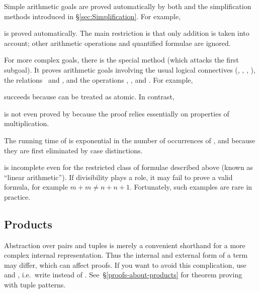 Simple arithmetic goals are proved automatically by both 
and the simplification methods introduced in \S\ref{sec:Simplification}.  For
example,

%
is proved automatically. The main restriction is that only addition is taken
into account; other arithmetic operations and quantified formulae are ignored.

For more complex goals, there is the special method
 (which attacks the first subgoal). It proves
arithmetic goals involving the usual logical connectives (\isasymnot,
\isasymand, \isasymor, \isasymimp), the relations \isasymle\ and \isa{<}, and
the operations \isa{+}, \isa{-},  and . For example,

%
succeeds because  can be treated as atomic.
In contrast,

%
is not even proved by  because the proof relies essentially
on properties of multiplication.

\begin{warn}
  The running time of  is exponential in the number of occurrences
  of ,  and
   because they are first eliminated by case distinctions.

   is incomplete even for the restricted class of formulae
  described above (known as ``linear arithmetic''). If divisibility plays a
  role, it may fail to prove a valid formula, for example $m+m \neq n+n+1$.
  Fortunately, such examples are rare in practice.
\end{warn}



\subsection{Products}


\begin{warn}
  Abstraction over pairs and tuples is merely a convenient shorthand for a
  more complex internal representation.  Thus the internal and external form
  of a term may differ, which can affect proofs. If you want to avoid this
  complication, use  and , i.e.\ write
   instead of
  .  See~\S\ref{proofs-about-products} for
  theorem proving with tuple patterns.
\end{warn}

